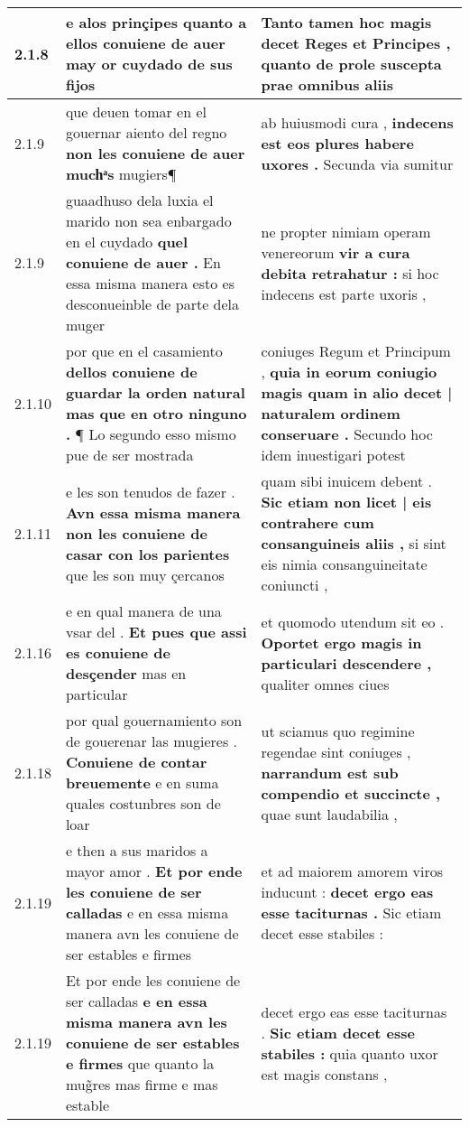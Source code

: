 \begin{tabular}{|p{1cm}|p{6.5cm}|p{6.5cm}|}
2.1.8 & e alos prinçipes \textbf{ quanto a ellos conuiene de auer } may or cuydado de sus fijos & Tanto tamen hoc magis decet Reges et Principes , \textbf{ quanto de prole suscepta } prae omnibus aliis \\\hline
2.1.9 & que deuen tomar en el gouernar aiento del regno \textbf{ non les conuiene de auer muchͣs } mugiers¶ & ab huiusmodi cura , \textbf{ indecens est eos plures habere uxores . } Secunda via sumitur \\\hline
2.1.9 & guaadhuso dela luxia el marido non sea enbargado en el cuydado \textbf{ quel conuiene de auer . } En essa misma manera esto es desconueinble de parte dela muger & ne propter nimiam operam venereorum \textbf{ vir a cura debita retrahatur : } si hoc indecens est parte uxoris , \\\hline
2.1.10 & por que en el casamiento \textbf{ dellos conuiene de guardar la orden natural mas que en otro ninguno . } ¶ Lo segundo esso mismo pue de ser mostrada & coniuges Regum et Principum , \textbf{ quia in eorum coniugio magis quam in alio decet | naturalem ordinem conseruare . } Secundo hoc idem inuestigari potest \\\hline
2.1.11 & e les son tenudos de fazer . \textbf{ Avn essa misma manera non les conuiene de casar con los parientes } que les son muy çercanos & quam sibi inuicem debent . \textbf{ Sic etiam non licet | eis contrahere cum consanguineis aliis , } si sint eis nimia consanguineitate coniuncti , \\\hline
2.1.16 & e en qual manera de una vsar del . \textbf{ Et pues que assi es conuiene de desçender } mas en particular & et quomodo utendum sit eo . \textbf{ Oportet ergo magis in particulari descendere , } qualiter omnes ciues \\\hline
2.1.18 & por qual gouernamiento son de gouerenar las mugieres . \textbf{ Conuiene de contar breuemente } e en suma quales costunbres son de loar & ut sciamus quo regimine regendae sint coniuges , \textbf{ narrandum est sub compendio et succincte , } quae sunt laudabilia , \\\hline
2.1.19 & e then a sus maridos a mayor amor . \textbf{ Et por ende les conuiene de ser calladas } e en essa misma manera avn les conuiene de ser estables e firmes & et ad maiorem amorem viros inducunt : \textbf{ decet ergo eas esse taciturnas . } Sic etiam decet esse stabiles : \\\hline
2.1.19 & Et por ende les conuiene de ser calladas \textbf{ e en essa misma manera avn les conuiene de ser estables e firmes } que quanto la mug̃res mas firme e mas estable & decet ergo eas esse taciturnas . \textbf{ Sic etiam decet esse stabiles : } quia quanto uxor est magis constans , \\\hline

\end{tabular}
